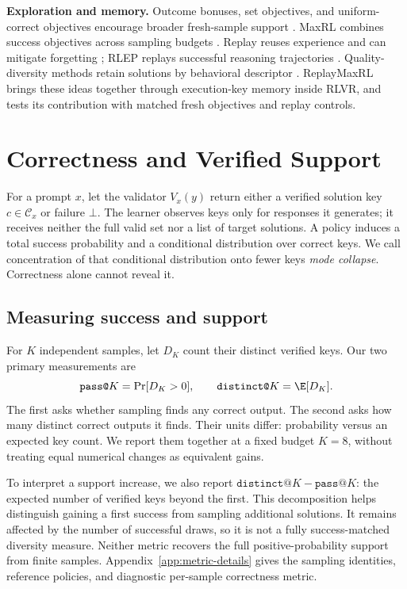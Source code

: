 \noindent\textbf{Exploration and memory.}
Outcome bonuses, set objectives, and uniform-correct objectives encourage
broader fresh-sample support
\citep{song2025outcome,chen2025passktraining,li2026setpo,lochab2026ucpo}.
MaxRL combines success objectives across sampling budgets
\citep{tajwar2026maxrl}. Replay reuses experience and can mitigate forgetting
\citep{lin1992selfimproving,rolnick2019replay}; RLEP replays successful reasoning
trajectories \citep{zhang2025rlep}. Quality-diversity methods retain solutions
by behavioral descriptor \citep{mouret2015illuminating}. ReplayMaxRL brings
these ideas together through execution-key memory inside RLVR, and tests
its contribution with matched fresh objectives and replay controls.

\section{Correctness and Verified Support}
\label{sec:collapse}

For a prompt $x$, let the validator $V_x(y)$ return either a verified solution
key $c\in\mathcal C_x$ or failure $\bot$. The learner observes keys only for
responses it generates; it receives neither the full valid set nor a list
of target solutions. A policy induces a total success probability and a
conditional distribution over correct keys. We call concentration of that
conditional distribution onto fewer keys \emph{mode collapse}. Correctness
alone cannot reveal it.

\subsection{Measuring success and support}
\label{sec:collapse-metrics}

For $K$ independent samples, let $D_K$ count their distinct verified keys.
Our two primary measurements are
\[
  \texttt{pass@}K=\Pr[D_K>0],
  \qquad
  \texttt{distinct@}K=\E[D_K].
\]
The first asks whether sampling finds any correct output. The second asks
how many distinct correct outputs it finds. Their units differ: probability
versus an expected key count. We report them together at a fixed budget
$K=8$, without treating equal numerical changes as equivalent gains.

To interpret a support increase, we also report
$\texttt{distinct@}K-\texttt{pass@}K$: the expected number of verified keys
beyond the first. This decomposition helps distinguish gaining a first
success from sampling additional solutions. It remains affected by the
number of successful draws, so it is not a fully success-matched diversity
measure. Neither metric recovers the full positive-probability support from
finite samples. Appendix~\ref{app:metric-details} gives the sampling identities,
reference policies, and diagnostic per-sample correctness metric.

